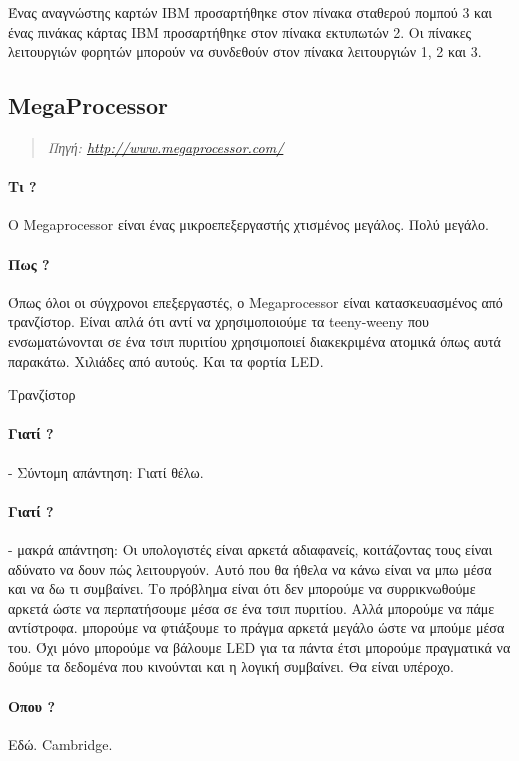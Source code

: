 \documentclass[11pt,a4paper,notitlepage,fleqn]{article}
\begin{document}
Ένας αναγνώστης καρτών IBM προσαρτήθηκε στον πίνακα σταθερού πομπού 3 και ένας πινάκας κάρτας IBM προσαρτήθηκε στον πίνακα εκτυπωτών 2. Οι πίνακες λειτουργιών φορητών μπορούν να συνδεθούν στον πίνακα λειτουργιών 1, 2 και 3.

\subsection{MegaProcessor}
\begin{quote}
	\textit{Πηγή: \url{http://www.megaprocessor.com/}}
\end{quote}
\paragraph{Τι ?} Ο Megaprocessor είναι ένας μικροεπεξεργαστής χτισμένος μεγάλος. Πολύ μεγάλο.


\paragraph{Πως ?} Όπως όλοι οι σύγχρονοι επεξεργαστές, ο Megaprocessor είναι κατασκευασμένος από τρανζίστορ. Είναι απλά ότι αντί να χρησιμοποιούμε τα teeny-weeny που ενσωματώνονται σε ένα τσιπ πυριτίου χρησιμοποιεί διακεκριμένα ατομικά όπως αυτά παρακάτω. Χιλιάδες από αυτούς. Και τα φορτία LED.

{\LARGE Τρανζίστορ}

\paragraph{Γιατί ?} - Σύντομη απάντηση: Γιατί θέλω.


\paragraph{Γιατί ?} - μακρά απάντηση: Οι υπολογιστές είναι αρκετά αδιαφανείς, κοιτάζοντας τους είναι αδύνατο να δουν πώς λειτουργούν. Αυτό που θα ήθελα να κάνω είναι να μπω μέσα και να δω τι συμβαίνει. Το πρόβλημα είναι ότι δεν μπορούμε να συρρικνωθούμε αρκετά ώστε να περπατήσουμε μέσα σε ένα τσιπ πυριτίου. Αλλά μπορούμε να πάμε αντίστροφα. μπορούμε να φτιάξουμε το πράγμα αρκετά μεγάλο ώστε να μπούμε μέσα του. Όχι μόνο μπορούμε να βάλουμε LED για τα πάντα έτσι μπορούμε πραγματικά να δούμε τα δεδομένα που κινούνται και η λογική συμβαίνει. Θα είναι υπέροχο.


\paragraph{Οπου ?} Εδώ. Cambridge.
\end{document}
